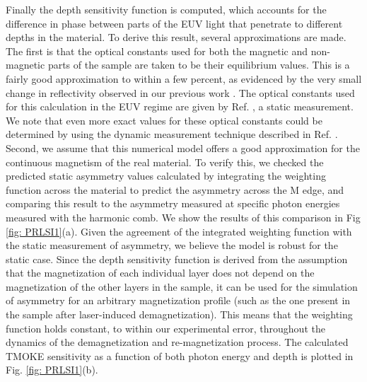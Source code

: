 Finally the depth sensitivity function is computed, which accounts for the difference in phase between parts of the EUV light that penetrate to different depths in the material. To derive this result, several approximations are made. The first is that the optical constants used for both the magnetic and non-magnetic parts of the sample are taken to be their equilibrium values. This is a fairly good approximation to within a few percent, as evidenced by the very small change in reflectivity observed in our previous work \cite{Tengdin2018}. The optical constants used for this calculation in the EUV regime are given by Ref. \cite{B.Johnson1974}, a static measurement. We note that even more exact values for these optical constants could be determined by using the dynamic measurement technique described in Ref. \cite{Zusin2018}. Second, we assume that this numerical model offers a good approximation for the continuous magnetism of the real material. To verify this, we checked the predicted static asymmetry values calculated by integrating the weighting function across the material to predict the asymmetry across the M edge, and comparing this result to the asymmetry measured at specific photon energies measured with the harmonic comb. We show the results of this comparison in Fig \ref{fig: PRLSI1}(a). Given the agreement of the integrated weighting function with the static measurement of asymmetry, we believe the model is robust for the static case. Since the depth sensitivity function is derived from the assumption that the magnetization of each individual layer does not depend on the magnetization of the other layers in the sample, it can be used for the simulation of asymmetry for an arbitrary magnetization profile (such as the one present in the sample after laser-induced demagnetization). This means that the weighting function holds constant, to within our experimental error, throughout the dynamics of the demagnetization and re-magnetization process. The calculated TMOKE sensitivity as a function of both photon energy and depth is plotted in Fig. \ref{fig: PRLSI1}(b).

